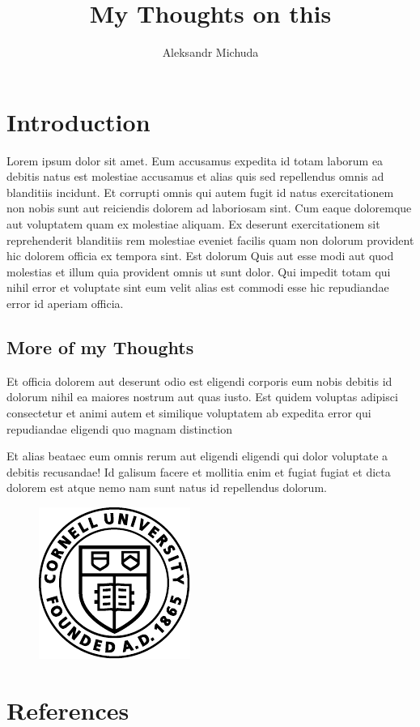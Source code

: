 \documentclass{article}
\title{My Thoughts on this}
\author{Aleksandr Michuda}
\begin{document}
\maketitle

\section{Introduction}

Lorem ipsum dolor sit amet. Eum accusamus expedita id totam laborum ea debitis natus est molestiae accusamus et alias quis sed repellendus omnis ad blanditiis incidunt. Et corrupti omnis qui autem fugit id natus exercitationem non nobis sunt aut reiciendis dolorem ad laboriosam sint. Cum eaque doloremque aut voluptatem quam ex molestiae aliquam. 
Ex deserunt exercitationem sit reprehenderit blanditiis rem molestiae eveniet facilis quam non dolorum provident hic dolorem officia ex tempora sint. Est dolorum Quis aut esse modi aut quod molestias et illum quia provident omnis ut sunt dolor. Qui impedit totam qui nihil error et voluptate sint eum velit alias est commodi esse hic repudiandae error id aperiam officia. 


\subsection{More of my Thoughts}

Et officia dolorem aut deserunt odio est eligendi corporis eum nobis debitis id dolorum nihil ea maiores nostrum aut quas iusto.  Est quidem voluptas adipisci consectetur et animi autem et similique voluptatem ab expedita error qui repudiandae eligendi quo magnam distinction \citep{posner_measuring_2004,alesina_fractionalization_2003}


Et alias beataec  eum omnis rerum aut eligendi eligendi qui dolor voluptate a debitis recusandae! Id galisum facere et mollitia enim et fugiat fugiat et dicta dolorem est atque nemo nam sunt natus id repellendus dolorum.\citep{alesina_fractionalization_2003}


\begin{figure}
    \includegraphics{figures/logo.pdf}
\end{figure}

\section{References}


\end{document}
